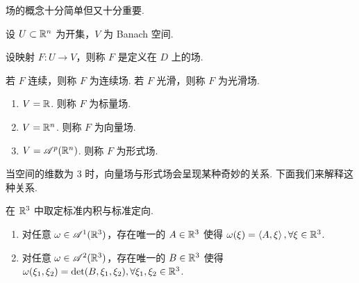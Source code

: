 
场的概念十分简单但又十分重要.

\begin{definition}
    设 $U\subset\mathbb{R}^n$ 为开集，$V$ 为 Banach 空间.

    设映射 $F:U\to V$，则称 $F$ 是定义在 $D$ 上的场.

    若 $F$ 连续，则称 $F$ 为连续场. 若 $F$ 光滑，则称 $F$ 为光滑场.

    \begin{enumerate}
        \item $V=\mathbb{R}$. 则称 $F$ 为标量场.
        
        \item $V=\mathbb{R}^n$. 则称 $F$ 为向量场.
        
        \item $V=\mathscr{A}^p(\mathbb{R}^n)$. 则称 $F$ 为形式场.
    \end{enumerate}
\end{definition}


当空间的维数为 $3$ 时，向量场与形式场会呈现某种奇妙的关系. 下面我们来解释这种关系.


\begin{property}
    在 $\mathbb{R}^3$ 中取定标准内积与标准定向.

    \begin{enumerate}
        \item 对任意 $\omega\in\mathscr{A}^1(\mathbb{R}^3)$，存在唯一的 $A\in\mathbb{R}^3$ 使得 $\omega(\xi)=\left\langle{A,\xi}\right\rangle,\forall\xi\in\mathbb{R}^3$.
        
        \item 对任意 $\omega\in\mathscr{A}^2(\mathbb{R}^3)$，存在唯一的 $B\in\mathbb{R}^3$ 使得 $\omega(\xi_1,\xi_2)=\det(B,\xi_1,\xi_2),\forall\xi_1,\xi_2\in\mathbb{R}^3$.
    \end{enumerate}
\end{property}
